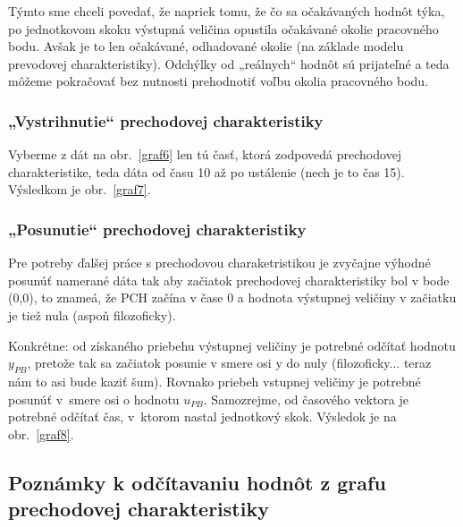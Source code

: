 \documentclass[a4paper, 10pt, ]{article}
\begin{document}
Týmto sme chceli povedať, že napriek tomu, že čo sa očakávaných hodnôt týka, po jednotkovom skoku výstupná veličina opustila očakávané okolie pracovného bodu. Avšak je to len očakávané, odhadované okolie (na základe modelu prevodovej charakteristiky). Odchýlky od „reálnych“ hodnôt sú prijateľné a teda môžeme pokračovať bez nutnosti prehodnotiť voľbu okolia pracovného bodu.







\subsubsection{„Vystrihnutie“ prechodovej charakteristiky}

Vyberme z dát na obr.~\ref{graf6} len tú časť, ktorá zodpovedá prechodovej charakteristike, teda dáta od času 10 až po ustálenie (nech je to čas 15). Výsledkom je obr.~\ref{graf7}.





\subsubsection{„Posunutie“ prechodovej charakteristiky}



Pre potreby ďalšej práce s prechodovou charaketristikou je zvyčajne výhodné posunúť namerané dáta tak aby začiatok prechodovej charakteristiky bol v bode (0,0), to znameá, že PCH začína v  čase 0 a hodnota výstupnej veličiny v začiatku je tiež nula (aspoň filozoficky).


Konkrétne: od získaného priebehu výstupnej veličiny je potrebné odčítať hodnotu $y_{PB}$, pretože tak sa začiatok posunie v smere osi y do nuly (filozoficky... teraz nám to asi bude kaziť šum). Rovnako priebeh vstupnej veličiny je potrebné posunúť v~smere osi o hodnotu $u_{PB}$. Samozrejme, od časového vektora je potrebné odčítať čas, v~ktorom nastal jednotkový skok. Výsledok je na obr.~\ref{graf8}.










\subsection{Poznámky k odčítavaniu hodnôt z grafu prechodovej charakteristiky}
\end{document}

